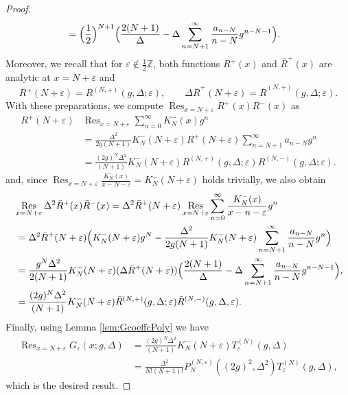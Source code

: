 \documentclass[11pt]{article}
\numberwithin{equation}{section}
\newcommand{\Z}{\mathbb{Z}} %
\newcommand{\e}{\varepsilon}
\newcommand{\cp}[2]{P^{(#1)}_{#2}} %
\DeclareMathOperator*{\Res}{Res} %
\theoremstyle{plain}
\theoremstyle{definition}
\theoremstyle{remark}
\begin{document}
\begin{proof}
\begin{align*}
     &= \Bigl(\frac12\Bigr)^{N+1} \Bigl( \frac{2 (N+1)}{\Delta} - \Delta \sum_{n = N+1}^{\infty} \frac{a_{n-N}}{n-N} g^{n-N-1} \Bigr).
   \end{align*}
   Moreover, we recall that for \(\e \notin \frac12 \Z \), both functions \(R^+(x)\) and \(\bar{R}^{+}(x)\) are analytic at \(x = N +\e \) and
   \[
     R^+(N+\e) = R^{(N,+)}(g,\Delta;\e), \qquad \Delta \bar{R}^{+}(N+\e)  = \bar{R}^{(N,+)}(g,\Delta;\e).
   \]
   With these preparations, we compute \(\Res_{x=N+\e} R^+(x) R^-(x) \) as 
   \begin{align*}
     R^{+}(N+\e) &\Res_{x=N+\e} \sum_{n=0}^{\infty} K_N^-(x)  g^n \\
      &=  \frac{\Delta^2}{2 g (N+1)}K_N^-(N+\e) R^{+}(N+\e)  \sum_{n=N+1}^{\infty} a_{n-N}  g^n \\
                                 &= \frac{(2g)^{N} \Delta^2}{(N+1)}   K_N^-(N+\e) R^{(N,+)}(g,\Delta;\e) R^{(N,-)}(g,\Delta;\e).
   \end{align*}
   and, since \(\Res_{x=N+\e} \frac{K_N^{-}(x)}{x - N - \e} =  K_N^-(N+\e)\) holds trivially, we also obtain
   \begin{align*}
     &\Res_{x=N+\e} \Delta^2 \bar{R}^+(x) \bar{R}^-(x) = \Delta^2 \bar{R}^{+}(N+\e) \Res_{x=N+\e} \sum_{n=0}^{\infty} \frac{K_N^-(x)}{x-n-\e}  g^n \\
     &\,= \Delta^2 \bar{R}^{+}(N+\e) \Bigl( K_N^{-}(N+\e) g^N - \frac{\Delta^2}{2 g (N+1)}K_N^-(N+\e) \sum_{n=N+1}^{\infty} \frac{a_{n-N}}{n-N}  g^n  \Bigr) \\
     &\,= \frac{g^N \Delta^2}{2(N+1)} K_N^{-}(N+\e) (\Delta \bar{R}^{+}(N+\e))  \Bigl( \frac{2 (N+1)}{\Delta} -  \Delta \sum_{n=N+1}^{\infty} \frac{a_{n-N}}{n-N}  g^{n-N-1}  \Bigr),\\
     &\,= \frac{(2g)^N \Delta^2}{(N+1)} K_N^-(N+\e) \bar{R}^{(N,+)}(g,\Delta;\e) \bar{R}^{(N,-)}(g,\Delta,\e).
   \end{align*}
   Finally, using Lemma \ref{lem:GcoeffcPoly} we have
   \begin{align*}
     \Res_{x=N+\e} G_\e(x;g,\Delta)
     &= \frac{(2g)^N \Delta^2}{(N+1)} K_N^-(N+\e) T^{(N)}_\e(g,\Delta) \\
     &= \frac{\Delta^2}{ N! (N+1)!} \cp{N,\e}{N}((2g)^2,\Delta^2) T^{(N)}_\e(g,\Delta),
   \end{align*}
   which is the desired result. 
\end{proof}
\end{document}
